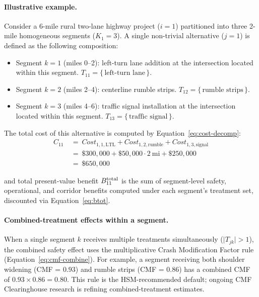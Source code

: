 \paragraph{Illustrative example.} Consider a 6-mile rural two-lane highway
project ($i = 1$) partitioned into three 2-mile homogeneous segments
($K_1 = 3$). A single non-trivial alternative ($j = 1$) is defined as the
following composition:
\begin{itemize}[leftmargin=2em, itemsep=2pt]
  \item Segment $k = 1$ (miles 0--2): left-turn lane addition at the
    intersection located within this segment. $T_{11} = \{\,\text{left-turn lane}\,\}$.
  \item Segment $k = 2$ (miles 2--4): centerline rumble strips.
    $T_{12} = \{\,\text{rumble strips}\,\}$.
  \item Segment $k = 3$ (miles 4--6): traffic signal installation at the
    intersection located within this segment.
    $T_{13} = \{\,\text{traffic signal}\,\}$.
\end{itemize}

\noindent The total cost of this alternative is computed by
Equation~\ref{eq:cost-decomp}:
\begin{align*}
C_{11}\ &=\ \mathit{Cost}_{1,1,\text{LTL}} + \mathit{Cost}_{1,2,\text{rumble}} + \mathit{Cost}_{1,3,\text{signal}} \\
       &=\ \$300{,}000 + \$50{,}000 \cdot 2\ \text{mi} + \$250{,}000 \\
       &=\ \$650{,}000
\end{align*}

\noindent and total present-value benefit $B^{\mathrm{total}}_{11}$ is the sum of
segment-level safety, operational, and corridor benefits computed under
each segment's treatment set, discounted via Equation~\ref{eq:btot}.

\paragraph{Combined-treatment effects within a segment.} When a single
segment $k$ receives multiple treatments simultaneously
($\lvert T_{jk} \rvert > 1$), the combined safety effect uses the
multiplicative Crash Modification Factor rule
(Equation~\ref{eq:cmf-combine}). For example, a segment receiving both
shoulder widening (CMF = $0.93$) and rumble strips (CMF = $0.86$) has a
combined CMF of $0.93 \times 0.86 = 0.80$. This rule is the HSM-recommended
default; ongoing CMF Clearinghouse research is refining combined-treatment
estimates.

